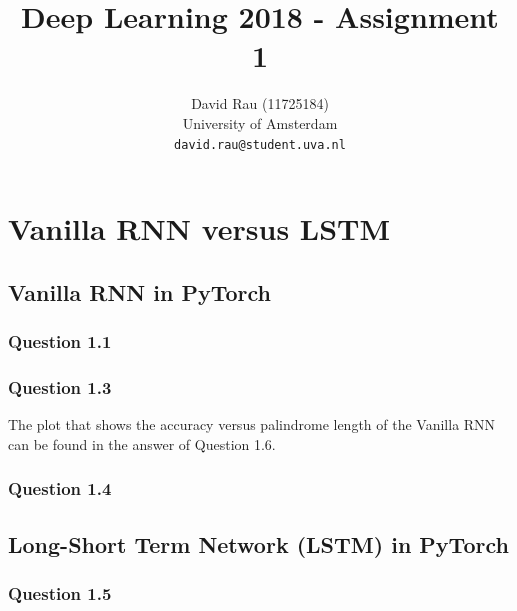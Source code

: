 \documentclass{article}
\title{Deep Learning 2018 - Assignment 1}
\author{
  David Rau (11725184) \\ 
  University of Amsterdam \\
  \texttt{david.rau@student.uva.nl} \\
}
\begin{document}

\maketitle


\section*{Vanilla RNN versus LSTM}
\subsection*{Vanilla RNN in PyTorch}
\subsubsection*{Question 1.1}
\subsubsection*{Question 1.3}
The plot that shows the accuracy versus palindrome length of the Vanilla RNN can be found in the answer of Question 1.6.
\subsubsection*{Question 1.4}
\subsection*{Long-Short Term Network (LSTM) in PyTorch}
\subsubsection*{Question 1.5}
\end{document}
